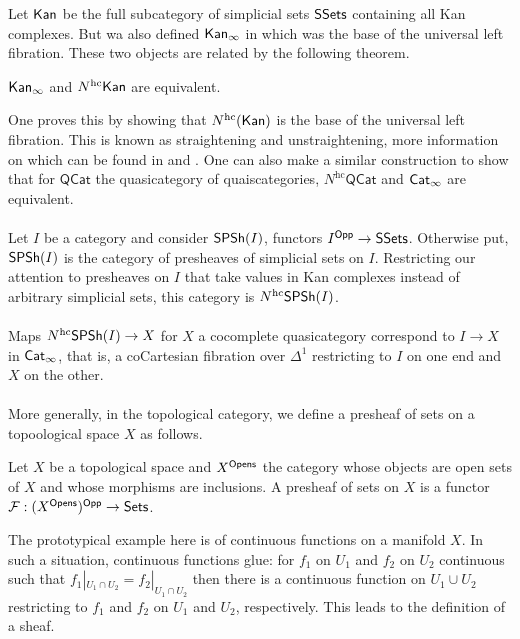 Let $\mathsf{Kan}$ be the full subcategory of simplicial sets $\mathsf{SSets}$ containing all Kan complexes. But wa also defined $\mathsf{Kan}_{\infty}$ in  which was the base of the universal left fibration. These two objects are related by the following theorem. 
\begin{theorem}[Lurie]\label{thm: kan-infty and hc nerve of kan are equivalent}
    $\mathsf{Kan}_{\infty}$ and $N^{\mathrm{hc}}\mathsf{Kan}$ are equivalent. 
\end{theorem}
One proves this by showing that $N^{\mathrm{hc}}(\mathsf{Kan})$ is the base of the universal left fibration. This is known as straightening and unstraightening, more information on which can be found in \cite[Ch. 4]{Land} and \cite[Ch. 3.2]{LurieHTT}. One can also make a similar construction to show that for $\mathsf{QCat}$ the quasicategory of quaiscategories, $N^{\mathrm{hc}}\mathsf{QCat}$ and $\mathsf{Cat}_{\infty}$ are equivalent. 
\\\\
Let $I$ be a category and consider $\mathsf{SPSh}(I)$, functors $I^{\mathsf{Opp}}\to\mathsf{SSets}$. Otherwise put, $\mathsf{SPSh}(I)$ is the category of presheaves of simplicial sets on $I$. Restricting our attention to presheaves on $I$ that take values in Kan complexes instead of arbitrary simplicial sets, this category is $N^{\mathrm{hc}}\mathsf{SPSh}(I)$. \\\\
Maps $N^{\mathrm{hc}}\mathsf{SPSh}(I)\to X$ for $X$ a cocomplete quasicategory correspond to $I\to X$ in $\mathsf{Cat}_{\infty}$, that is, a coCartesian fibration over $\Delta^{1}$ restricting to $I$ on one end and $X$ on the other. \\\\
More generally, in the topological category, we define a presheaf of sets on a topoological space $X$ as follows. 
\begin{definition}\label{def: presheaf on topological space}
    Let $X$ be a topological space and $X^{\mathsf{Opens}}$ the category whose objects are open sets of $X$ and whose morphisms are inclusions. A presheaf of sets on $X$ is a functor $\mathcal{F}:(X^{\mathsf{Opens}})^{\mathsf{Opp}}\to \mathsf{Sets}$. 
\end{definition}
The prototypical example here is of continuous functions on a manifold $X$. In such a situation, continuous functions glue: for $f_{1}$ on $U_{1}$ and $f_{2}$ on $U_{2}$ continuous such that $f_{1}|_{U_{1}\cap U_{2}}=f_{2}|_{U_{1}\cap U_{2}}$ then there is a continuous function on $U_{1}\cup U_{2}$ restricting to $f_{1}$ and $f_{2}$ on $U_{1}$ and $U_{2}$, respectively. This leads to the definition of a sheaf. 
